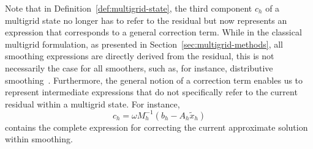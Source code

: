 Note that in Definition~\ref{def:multigrid-state}, the third component $c_{h}$ of a multigrid state no longer has to refer to the residual but now represents an expression that corresponds to a general correction term.
While in the classical multigrid formulation, as presented in Section~\ref{sec:multigrid-methods}, all smoothing expressions are directly derived from the residual, this is not necessarily the case for all smoothers, such as, for instance, distributive smoothing~\cite{trottenberg2000multigrid}.
Furthermore, the general notion of a correction term enables us to represent intermediate expressions that do not specifically refer to the current residual within a multigrid state.
For instance,
\begin{equation*}
    c_h = \omega M_h^{-1} \left( b_h - A_h \tilde{x}_h \right)
\end{equation*}
contains the complete expression for correcting the current approximate solution within smoothing.
